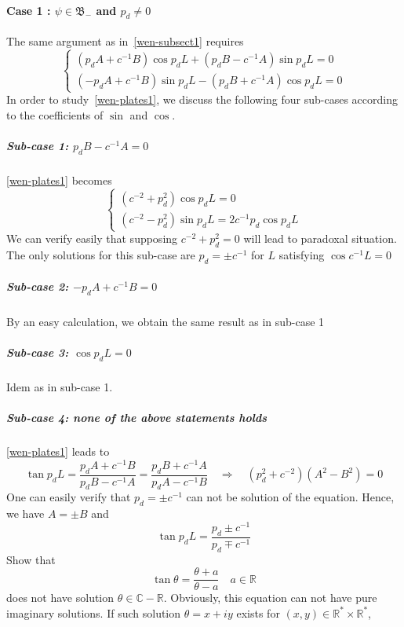 \paragraph{Case 1 : $\psi \in \mathfrak{B}_-$ and $p_d \neq 0$}
The same argument as in~\cref{wen-subsect1} requires
\begin{equation}\label{wen-plates1}
\begin{cases}
(p_d A + c^{-1} B) \cos p_d L + (p_d B - c^{-1} A)\sin p_d L = 0 \\
(- p_d A + c^{-1}B)\sin p_d L - (p_d B + c^{-1} A)\cos p_d L = 0
\end{cases}
\end{equation}
In order to study~\cref{wen-plates1}, we discuss the following four sub-cases according to the coefficients of $\sin$ and $\cos$.
\subparagraph{Sub-case 1: $ p_d B - c^{-1}A = 0$}
\cref{wen-plates1} becomes
\begin{equation*}
\begin{cases}
(c^{-2} + p_d ^2)\cos p_d L = 0 \\
(c^{-2} - p_d^2)\sin p_d L = 2 c^{-1}p_d \cos p_d L
\end{cases}
\end{equation*}
We can verify easily that supposing $ c^{-2} + p_d^2 = 0 $ will lead to paradoxal situation. The only solutions for this sub-case are $p_d = \pm c^{-1}$ for $L$ satisfying $\cos c^{-1} L = 0$
%
\subparagraph{Sub-case 2: $ -p_d A + c^{-1}B = 0$}
By an easy calculation, we obtain the same result as in sub-case 1
%
\subparagraph{Sub-case 3: $\cos p_d L = 0 $}
Idem as in sub-case 1.
%
\subparagraph{Sub-case 4: none of the above statements holds}
\cref{wen-plates1} leads to
\begin{equation*}
\tan p_d L = \frac{p_d A + c^{-1} B }{p_d B - c^{-1} A} = 
\frac{p_d B + c^{-1}A}{p_d A- c^{-1} B}
\quad\Rightarrow\quad
(p_d ^2 + c^{-2})(A^2 - B^2 )= 0
\end{equation*}
One can easily verify that $p_d = \pm c^{-1}$ can not be solution of the equation. 
Hence, we have $A = \pm B$ and
\begin{equation}\label{wen-tan}
\tan p_d L = \frac{p_d \pm c^{-1}}{p_d \mp c^{-1}}
\end{equation}
Show that
\begin{equation*}
\tan \theta = \frac{\theta + a}{\theta - a} \quad a\in \mathbb{R} 
\end{equation*}
does not have solution $\theta \in \mathbb{C} - \mathbb{R}$.
Obviously, this equation can not have pure imaginary solutions.
If such solution $\theta = x + i y$ exists for $(x, y) \in\mathbb{R}^*\times\mathbb{R}^*$,
